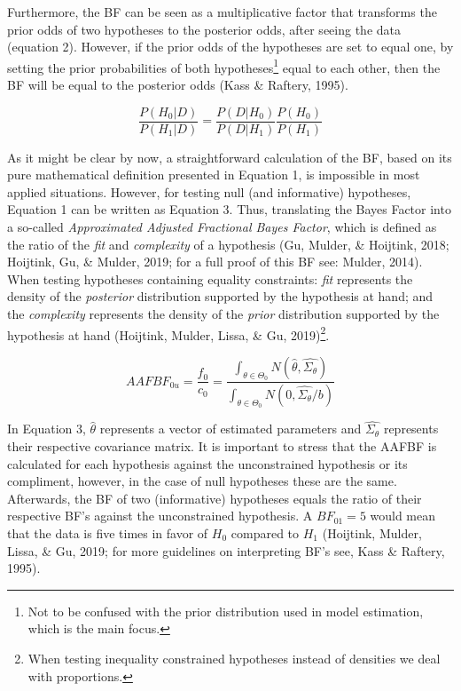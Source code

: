 \documentclass[
  english,
  man]{apa6}
\begin{document}
Furthermore, the BF can be seen as a multiplicative factor that transforms the prior odds of two hypotheses to the posterior odds, after seeing the data (equation 2). However, if the prior odds of the hypotheses are set to equal one, by setting the prior probabilities of both hypotheses\footnote{Not to be confused with the prior distribution used in model estimation, which is the main focus.} equal to each other, then the BF will be equal to the posterior odds (Kass \& Raftery, 1995).

\begin{equation}
\frac{P(H_0|D)}{P(H_1|D)} = \frac{P(D|H_0)}{P(D|H_1)} \frac{P(H_0)}{P(H_1)}
\end{equation}

As it might be clear by now, a straightforward calculation of the BF, based on its pure mathematical definition presented in Equation 1, is impossible in most applied situations. However, for testing null (and informative) hypotheses, Equation 1 can be written as Equation 3. Thus, translating the Bayes Factor into a so-called \emph{Approximated Adjusted Fractional Bayes Factor}, which is defined as the ratio of the \emph{fit} and \emph{complexity} of a hypothesis
(Gu, Mulder, \& Hoijtink, 2018; Hoijtink, Gu, \& Mulder, 2019; for a full proof of this BF see: Mulder, 2014). When testing hypotheses containing equality constraints: \emph{fit} represents the density of the \emph{posterior} distribution supported by the hypothesis at hand; and the \emph{complexity} represents the density of the \emph{prior} distribution supported by the hypothesis at hand (Hoijtink, Mulder, Lissa, \& Gu, 2019)\footnote{When testing inequality constrained hypotheses instead of densities we deal with proportions.}.

\begin{equation}
AAFBF_{0u} = \frac{f_0}{c_0} = \frac{\int_{\theta \in \Theta_0}N(\hat{\theta},\hat{\Sigma_{\theta}})}{\int_{\theta \in \Theta_0}N(0,\hat{\Sigma_{\theta}}/b)}
\end{equation}

In Equation 3, \(\hat{\theta}\) represents a vector of estimated parameters and \(\hat{\Sigma_{\theta}}\) represents their respective covariance matrix. It is important to stress that the AAFBF is calculated for each hypothesis against the unconstrained hypothesis or its compliment, however, in the case of null hypotheses these are the same. Afterwards, the BF of two (informative) hypotheses equals the ratio of their respective BF's against the unconstrained hypothesis. A \(BF_{01} = 5\) would mean that the data is five times in favor of \(H_0\) compared to \(H_1\) (Hoijtink, Mulder, Lissa, \& Gu, 2019; for more guidelines on interpreting BF's see, Kass \& Raftery, 1995).
\end{document}
